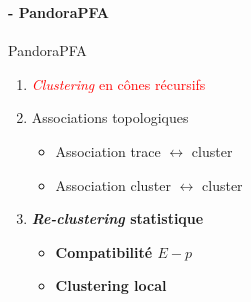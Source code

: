 \documentclass[8pt]{beamer}
\begin{document}
  \begin{frame}
  \frametitle{\secname}
  \framesubtitle{\subsecname - PandoraPFA}
  \footnotesize
    \begin{minipage}{0.6\linewidth}
    \begin{block}{PandoraPFA}
      \begin{enumerate}
        \item \textcolor{red}{\textit{Clustering} en cônes récursifs}
        \item \textcolor{MyGreen}{Associations topologiques}
        \begin{itemize}
          \item \textcolor{MyGreen}{\footnotesize Association trace $\leftrightarrow$ cluster}
          \item \textcolor{MyGreen}{\footnotesize Association cluster $\leftrightarrow$ cluster}
        \end{itemize}
        \item  \textbf{\textit{Re-clustering} statistique}
        \begin{itemize}
          \item \textbf{\footnotesize Compatibilité $E-p$}
          \item \textbf{\footnotesize Clustering local}
        \end{itemize}
      \end{enumerate}
    \end{block}
    ~
    ~ \\
    \end{minipage} \hfill
    \begin{minipage}{0.39\linewidth}
      \begin{center}
\end{center}
\end{minipage}
\end{frame}
\end{document}
